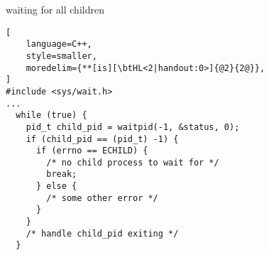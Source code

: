 
\begin{frame}[fragile,label=waitForAny]{waiting for all children}
\begin{lstlisting}[
    language=C++,
    style=smaller,
    moredelim={**[is][\btHL<2|handout:0>]{@2}{2@}},
]
#include <sys/wait.h>
...
  while (true) {
    pid_t child_pid = waitpid(-1, &status, 0);
    if (child_pid == (pid_t) -1) {
      if (errno == ECHILD) {
        /* no child process to wait for */
        break;
      } else {
        /* some other error */
      }
    }
    /* handle child_pid exiting */
  }
\end{lstlisting}
\end{frame}
